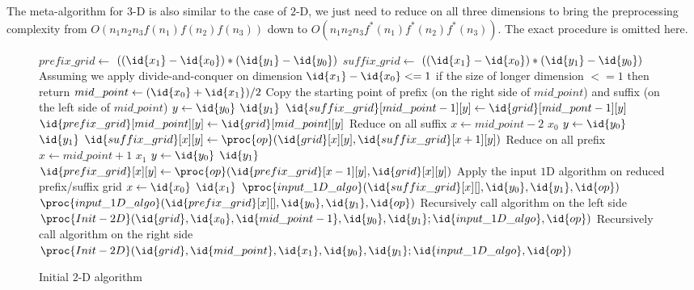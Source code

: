 The meta-algorithm for $3$-D is also similar to the case of $2$-D, we
just need to reduce on all three dimensions to bring the preprocessing
complexity from $O(n_1 n_2 n_3 f(n_1) f(n_2) f(n_3))$ down to $O(n_1
n_2 n_3 f^*(n_1) f^*(n_2) f^*(n_3))$. The exact procedure is omitted
here.


\begin{figure}[!ht]
\small
\begin{codebox}
\li     $prefix\_grid \gets$ \New $((\id{x_1} - \id{x_0}) * (\id{y_1} - \id{y_0})$
\li     $suffix\_grid \gets$ \New $((\id{x_1} - \id{x_0}) * (\id{y_1} - \id{y_0})$
\li     \Comment Assuming we apply divide-and-conquer on dimension 
\li     \If $\id{x_1} - \id{x_0} <= 1$
\li         \Then \Return \Comment if the size of longer dimension $ <= 1$ then return
\li         \Else 
\li              $mid\_point \gets (\id{x_0} + \id{x_1})/2$
\li              \Comment Copy the starting point of prefix (on the right side of $mid\_point$)
\li              \Comment and suffix (on the left side of $mid\_point$)
\li              \For $y \gets \id{y_0}$ \To $\id{y_1}$
\li                  \Do $\id{suffix\_grid}[mid\_point-1][y] \gets \id{grid}[mid\_pont-1][y]$
\li                      $\id{prefix\_grid}[mid\_point][y] \gets \id{grid}[mid\_point][y]$ \End
\li              \Comment Reduce on all suffix
\li              \For $x \gets mid\_point-2$ \Downto $x_0$ 
\li                  \Do \For $y \gets \id{y_0}$ \To $\id{y_1}$
\li                      \Do $\id{suffix\_grid}[x][y] \gets \proc{op}(\id{grid}[x][y], \id{suffix\_grid}[x+1][y])$ \End \End
\li              \Comment Reduce on all prefix
\li              \For $x \gets mid\_point+1$ \To $x_1$
\li                  \Do \For $y \gets \id{y_0}$ \To $\id{y_1}$
\li                      \Do $\id{prefix\_grid}[x][y] \gets \proc{op}(\id{prefix\_grid}[x-1][y], \id{grid}[x][y])$ \End \End
\li              \Comment Apply the input $1$D algorithm on reduced prefix/suffix grid
\li              \Parfor $x \gets \id{x_0}$ \To $\id{x_1}$
\li                  \Do $\proc{input\_1D\_algo}(\id{suffix\_grid}[x][], \id{y_0}, \id{y_1}, \id{op})$
\li                      $\proc{input\_1D\_algo}(\id{prefix\_grid}[x][], \id{y_0}, \id{y_1}, \id{op})$ \End
\li              \Comment Recursively call  algorithm on the left side
\li              \Spawn $\proc{Init-2D}(\id{grid}, \id{x_0}, \id{mid\_point-1}, \id{y_0}, \id{y_1}; \id{input\_1D\_algo}, \id{op})$ 
\li              \Comment Recursively call  algorithm on the right side
\li                     $\proc{Init-2D}(\id{grid}, \id{mid\_point}, \id{x_1}, \id{y_0}, \id{y_1}; \id{input\_1D\_algo}, \id{op})$ 
\li              \Sync \End
\end{codebox}
\caption{Initial $2$-D algorithm}
\label{fig:init-2D-algo}
\end{figure}

